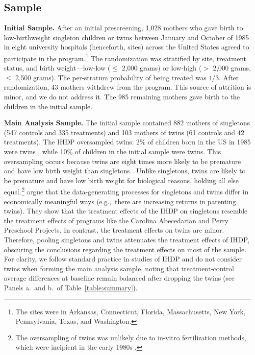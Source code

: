\subsection{ Sample} 

\noindent \textbf{Initial Sample.} After an initial prescreening, 1,028 mothers who gave birth to low-birthweight singleton children or twins between January and October of 1985 in eight university hospitals (henceforth, sites) across the United States agreed to participate in the program.\footnote{The sites were in Arkansas, Connecticut, Florida, Massachusetts, New York, Pennsylvania, Texas, and Washington.} The randomization was stratified by site, treatment status, and birth weight---low-low ($\leq$ 2,000 grams) or low-high ($>$ 2,000 grams, $\leq$ 2,500 grams). The per-stratum probability of being treated was $1/3$. After randomization, 43 mothers withdrew from the program. This source of attrition is minor, and we do not address it. The 985 remaining mothers gave birth to the children in the initial sample.

\noindent \textbf{Main Analysis Sample.} The initial sample contained 882 mothers of singletons (547 controls and 335 treatments) and 103 mothers of twins (61 controls and 42 treatments). The IHDP oversampled twins: 2\% of children born in the US in 1985 were twins \citep{natality}, while 10\% of children in the initial sample were twins. This oversampling occurs because twins are eight times more likely to be premature and have low birth weight than singletons \citep{birthdata}. Unlike singletons, twins are likely to be premature and have low birth weight for biological reasons, holding all else equal.\footnote{The oversampling of twins was unlikely due to in-vitro fertilization methods, which were incipient in the early 1980s \citep{wang2006vitro}.} \citet{douganHighQualityEarlyChildhoodEducation2023} argue that the data-generating processes for singletons and twins differ in economically meaningful ways (e.g.,\ there are increasing returns in parenting twins). They show that the treatment effects of the IHDP on singletons resemble the treatment effects of programs like the Carolina Abecedarian and Perry Preschool Projects. In contrast, the treatment effects on twins are minor. Therefore, pooling singletons and twins attenuates the treatment effects of IHDP, obscuring the conclusions regarding the treatment effects on most of the sample. For clarity, we follow standard practice in studies of IHDP \citep[e.g.,][]{chaparroEarlyChildhoodCare2020a} and do not consider twins when forming the main analysis sample, noting that treatment-control average differences at baseline remain balanced after dropping the twins (see Panels a.\  and b.\ of Table~\ref{table:summary}). 

